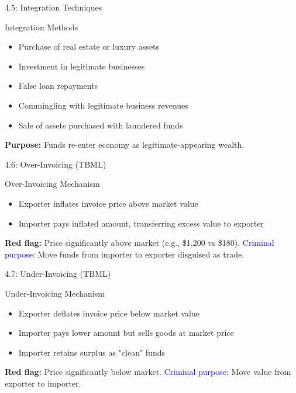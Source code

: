 \documentclass{beamer}
\begin{document}
	\begin{frame}{4.5: Integration Techniques}
		\begin{block}{Integration Methods}
			\begin{itemize}
				\item Purchase of real estate or luxury assets
				\item Investment in legitimate businesses
				\item False loan repayments
				\item Commingling with legitimate business revenues
				\item Sale of assets purchased with laundered funds
			\end{itemize}
		\end{block}
		\textbf{Purpose:} Funds re-enter economy as legitimate-appearing wealth.
	\end{frame}
	
	\begin{frame}{4.6: Over-Invoicing (TBML)}
		\begin{block}{Over-Invoicing Mechanism}
			\begin{itemize}
				\item Exporter inflates invoice price above market value
				\item Importer pays inflated amount, transferring excess value to exporter
			\end{itemize}
		\end{block}
		\textbf{Red flag:} Price significantly above market (e.g., \$1,200 vs \$180).
		\textcolor{blue}{Criminal purpose:} Move funds from importer to exporter disguised as trade.
	\end{frame}
	
	\begin{frame}{4.7: Under-Invoicing (TBML)}
		\begin{block}{Under-Invoicing Mechanism}
			\begin{itemize}
				\item Exporter deflates invoice price below market value
				\item Importer pays lower amount but sells goods at market price
				\item Importer retains surplus as "clean" funds
			\end{itemize}
		\end{block}
		\textbf{Red flag:} Price significantly below market.
		\textcolor{blue}{Criminal purpose:} Move value from exporter to importer.
	\end{frame}
	
\end{document}
